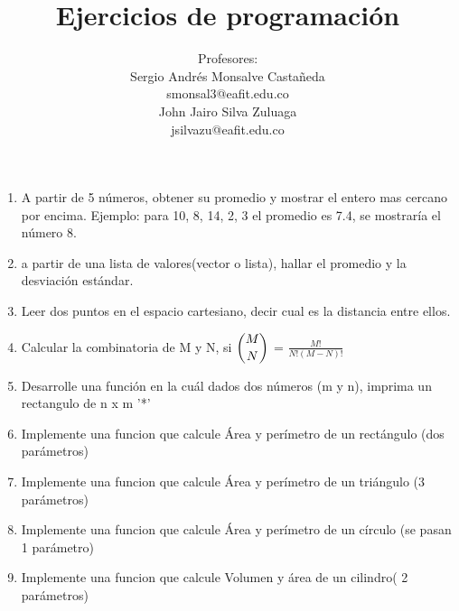 \documentclass[11pt,letterpaper]{article}
\title{Ejercicios de programación}
\author{
	Profesores:\\[0.5cm]
	Sergio Andrés Monsalve Castañeda\\
	smonsal3@eafit.edu.co\\[1cm]
    John Jairo Silva Zuluaga \\
    jsilvazu@eafit.edu.co
}
\begin{document}
 
\pagestyle{fancyplain}
\fancyhf{}
\headheight=20pt %
\renewcommand{\headrulewidth}{0pt} %


\fancyfoot[c]{\thepage}

\maketitle




\begin{enumerate}
        \item A partir de 5 números, obtener su promedio y mostrar el entero mas cercano por encima. 
        Ejemplo: para 10, 8, 14, 2, 3 el promedio es 7.4, se mostraría el número 8.
        
        \item a partir de una lista de valores(vector o lista), hallar el promedio y la desviación estándar.
        
        \item Leer dos puntos en el espacio cartesiano, decir cual es la distancia entre ellos.
        
        \item Calcular la combinatoria de M y N, si $\dbinom{M}{N}$ = $\frac{M!}{N!(M-N)!}$
        
        \item Desarrolle una función en la cuál dados dos números (m y n), imprima un rectangulo de n x m '*' 
        
        \item Implemente una funcion que calcule Área y perímetro de un rectángulo (dos parámetros)
        
        \item Implemente una funcion que calcule Área y perímetro de un triángulo (3 parámetros)
        
        \item Implemente una funcion que calcule Área y perímetro de un círculo (se pasan 1 parámetro)
        
        \item Implemente una funcion que calcule Volumen y área de un cilindro( 2 parámetros)
        

\end{enumerate}
\end{document}
